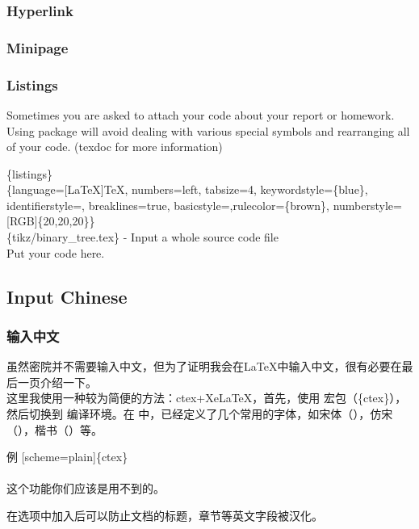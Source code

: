\begin{frame}
	\frametitle{Hyperlink}
\end{frame}

\begin{frame}
	\frametitle{Minipage}
\end{frame}

\begin{frame}
	\frametitle{Listings}
	Sometimes you are asked to attach your code about your report or homework. Using  package will avoid dealing with various special symbols and rearranging all of your code. (\alert{texdoc}  for more information)
	\begin{example}
		\{listings\}\\
		\{language=[LaTeX]TeX, numbers=left, tabsize=4, keywordstyle=\{blue\}, identifierstyle=, breaklines=true, basicstyle=,rulecolor=\{brown\}, numberstyle=[RGB]\{20,20,20\}\}\\
		\{tikz/binary\_tree.tex\} - Input a whole source code file
		\\
		Put your code here.\\
	\end{example} 
\end{frame}

\subsection{Input Chinese}

\begin{frame}
	\songti
	\frametitle{输入中文}
	\qquad 虽然密院并不需要输入中文，但为了证明我会在\LaTeX 中输入中文，很有必要在最后一页介绍一下。\\
	\qquad 这里我使用一种较为简便的方法：ctex+XeLaTeX，首先，使用  宏包（\{ctex\}），然后切换到  编译环境。在  中，已经定义了几个常用的字体，如宋体（），仿宋（），楷书（）等。
	\begin{exampleblock}{例}
		[scheme=plain]\{ctex\}\\
		\\
		这个功能你们应该是用不到的。
	\end{exampleblock}
	\qquad 在选项中加入\structure{[scheme=plain]}后可以防止文档的标题，章节等英文字段被汉化。
\end{frame}
